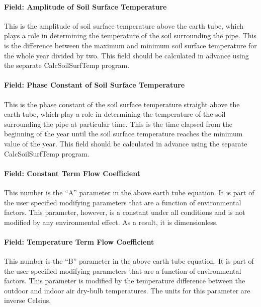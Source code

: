 \paragraph{Field: Amplitude of Soil Surface Temperature}\label{field-amplitude-of-soil-surface-temperature}

This is the amplitude of soil surface temperature above the earth tube, which plays a role in determining the temperature of the soil surrounding the pipe. This is the difference between the maximum and minimum soil surface temperature for the whole year divided by two. This field should be calculated in advance using the separate CalcSoilSurfTemp program.

\paragraph{Field: Phase Constant of Soil Surface Temperature}\label{field-phase-constant-of-soil-surface-temperature}

This is the phase constant of the soil surface temperature straight above the earth tube, which play a role in determining the temperature of the soil surrounding the pipe at particular time. This is the time elapsed from the beginning of the year until the soil surface temperature reaches the minimum value of the year. This field should be calculated in advance using the separate CalcSoilSurfTemp program.

\paragraph{Field: Constant Term Flow Coefficient}\label{field-constant-term-flow-coefficient}

This number is the ``A'' parameter in the above earth tube equation. It is part of the user specified modifying parameters that are a function of environmental factors. This parameter, however, is a constant under all conditions and is not modified by any environmental effect. As a result, it is dimensionless.

\paragraph{Field: Temperature Term Flow Coefficient}\label{field-temperature-term-flow-coefficient}

This number is the ``B'' parameter in the above earth tube equation. It is part of the user specified modifying parameters that are a function of environmental factors. This parameter is modified by the temperature difference between the outdoor and indoor air dry-bulb temperatures. The units for this parameter are inverse Celsius.

